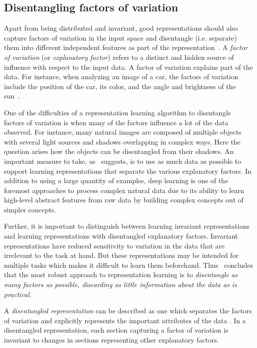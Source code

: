 \documentclass[12pt,a4paper]{article}
\begin{document}
\subsection{Disentangling factors of variation}\label{subsec:unsupDFoV}
Apart from being distributed and invariant, good representations should also capture factors of variation in the input space and disentangle (i.e. separate) them into different independent features as part of the representation~\cite{ReprLearning}. A \textit{factor of variation} (or \textit{explanatory factor}) refers to a distinct and hidden source of influence with respect to the input data. A factor of variation explains part of the data. For instance, when analyzing an image of a car, the factors of variation include the position of the car, its color, and the angle and brightness of the sun~\cite{DeepLearningBook}.

One of the difficulties of a representation learning algorithm to disentangle factors of variation is when many of the factors influence a lot of the data observed. For instance, many natural images are composed of multiple objects with several light sources and shadows overlapping in complex ways. Here the question arises how the objects can be disentangled from their shadows. An important measure to take, as~\cite{ReprLearning} suggests, is to use as much data as possible to support learning representations that separate the various explanatory factors. In addition to using a large quantity of examples, deep learning is one of the foremost approaches to process complex natural data due to its ability to learn high-level abstract features from raw data by building complex concepts out of simpler concepts. 

Further, it is important to distinguish between learning invariant representations and learning representations with disentangled explanatory factors. Invariant representations have reduced sensitivity to variation in the data that are irrelevant to the task at hand. But these representations may be intended for multiple tasks which makes it difficult to learn them beforehand. Thus~\cite{ReprLearning} concludes that the most robust approach to representation learning is to \textit{disentangle as many factors as possible, discarding as little information about the data as is practical}.

A \textit{disentangled representation} can be described as one which separates the factors of variation and explicitly represents the important attributes of the data \cite{Framework4QuantEvalDisRepr}. In a disentangled representation, each section capturing a factor of variation is invariant to changes in sections representing other explanatory factors.
\end{document}
